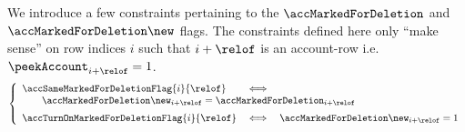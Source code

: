 We introduce a few constraints pertaining to the $\accMarkedForDeletion$ and $\accMarkedForDeletion\new$ flags.
The constraints defined here only ``make sense'' on row indices $i$ such that $i + \relof$ is an account-row i.e.
$\peekAccount_{i + \relof} = 1$.
\[
	\left\{ \begin{array}{lcl}
		\accSameMarkedForDeletionFlag   {i}{\relof} & \iff \\
		\multicolumn{3}{l}{
			\qquad \accMarkedForDeletion\new _{i + \relof}
			=
			\accMarkedForDeletion _{i + \relof}
		}
		\vspace{2mm} \\
		\accTurnOnMarkedForDeletionFlag {i}{\relof} & \iff & \accMarkedForDeletion\new _{i + \relof} = 1            \\
	\end{array} \right.
\]
